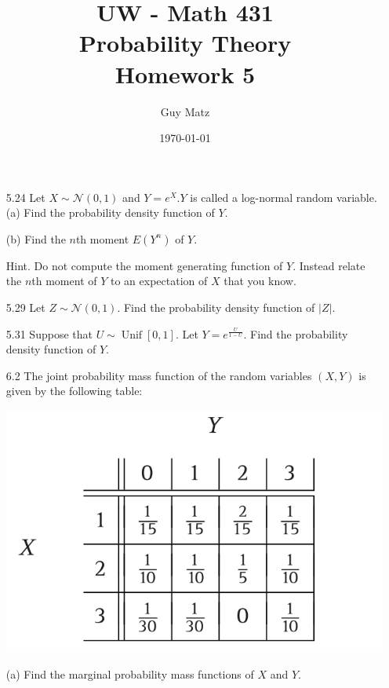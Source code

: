 \documentclass[10pt]{article}
\title{UW - Math 431 \\
Probability Theory \\
Homework 5}
\author{Guy Matz}
\date{\today}
\begin{document}

\begin{itemize}

	\item[5.24] Let $X \sim \mathcal{N}(0,1)$ and $Y=e^{X} . Y$ is called a log-normal random variable. (a) Find the probability density function of $Y$.

(b) Find the $n$th moment $E\left(Y^{n}\right)$ of $Y$.

Hint. Do not compute the moment generating function of $Y$. Instead relate the $n$th moment of $Y$ to an expectation of $X$ that you know.

\newpage
	\item[5.29] Let $Z \sim \mathcal{N}(0,1)$. Find the probability density function of $|Z|$.

\newpage
	\item[5.31] Suppose that $U \sim \operatorname{Unif}[0,1]$. Let $Y=e^{\frac{U}{1-U}}$. Find the probability density function of $Y$.

\newpage
	\item[6.2] The joint probability mass function of the random variables $(X, Y)$ is given by the following table:

\begin{center}
\includegraphics[max width=\textwidth]{images/exercise-6.2.png}

\end{center}

(a) Find the marginal probability mass functions of $X$ and $Y$.


\end{itemize}
\end{document}
